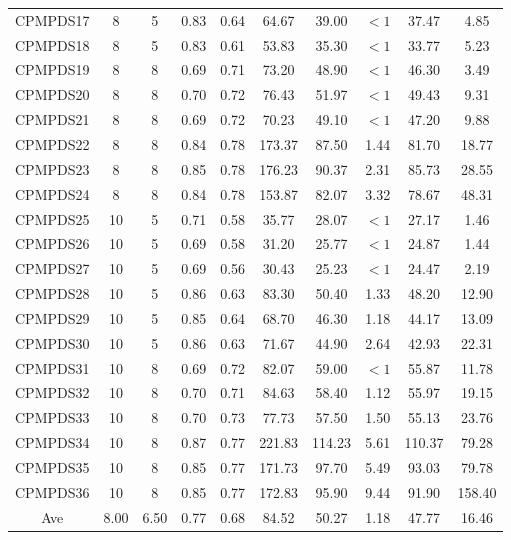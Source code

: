 \documentclass[review,3p,times,authoryear,12pt]{elsarticle}
\begin{document}
\begin{table}[htbp]
\begin{tabular}{c|c|c|c|c|c|c|c|c|c}
    CPMPDS17 & 8     & 5     & 0.83  & 0.64  & 64.67   & 39.00  & $<1$    & 37.47  & 4.85  \\
    CPMPDS18 & 8     & 5     & 0.83  & 0.61  & 53.83   & 35.30  & $<1$    & 33.77  & 5.23  \\
    CPMPDS19 & 8     & 8     & 0.69  & 0.71  & 73.20   & 48.90  & $<1$    & 46.30  & 3.49  \\
    CPMPDS20 & 8     & 8     & 0.70  & 0.72  & 76.43   & 51.97  & $<1$    & 49.43  & 9.31  \\
    CPMPDS21 & 8     & 8     & 0.69  & 0.72  & 70.23   & 49.10  & $<1$    & 47.20  & 9.88  \\
    CPMPDS22 & 8     & 8     & 0.84  & 0.78  & 173.37  & 87.50  & 1.44    & 81.70  & 18.77  \\
    CPMPDS23 & 8     & 8     & 0.85  & 0.78  & 176.23  & 90.37  & 2.31    & 85.73  & 28.55  \\
    CPMPDS24 & 8     & 8     & 0.84  & 0.78  & 153.87  & 82.07  & 3.32    & 78.67  & 48.31  \\
    CPMPDS25 & 10    & 5     & 0.71  & 0.58  & 35.77   & 28.07  & $<1$    & 27.17  & 1.46  \\
    CPMPDS26 & 10    & 5     & 0.69  & 0.58  & 31.20   & 25.77  & $<1$    & 24.87  & 1.44  \\
    CPMPDS27 & 10    & 5     & 0.69  & 0.56  & 30.43   & 25.23  & $<1$    & 24.47  & 2.19  \\
    CPMPDS28 & 10    & 5     & 0.86  & 0.63  & 83.30   & 50.40  & 1.33    & 48.20  & 12.90  \\
    CPMPDS29 & 10    & 5     & 0.85  & 0.64  & 68.70   & 46.30  & 1.18    & 44.17  & 13.09  \\
    CPMPDS30 & 10    & 5     & 0.86  & 0.63  & 71.67   & 44.90  & 2.64    & 42.93  & 22.31  \\
    CPMPDS31 & 10    & 8     & 0.69  & 0.72  & 82.07   & 59.00  & $<1$    & 55.87  & 11.78  \\
    CPMPDS32 & 10    & 8     & 0.70  & 0.71  & 84.63   & 58.40  & 1.12    & 55.97  & 19.15  \\
    CPMPDS33 & 10    & 8     & 0.70  & 0.73  & 77.73   & 57.50  & 1.50    & 55.13  & 23.76  \\
    CPMPDS34 & 10    & 8     & 0.87  & 0.77  & 221.83  & 114.23 & 5.61    & 110.37 & 79.28  \\
    CPMPDS35 & 10    & 8     & 0.85  & 0.77  & 171.73  & 97.70  & 5.49    & 93.03  & 79.78  \\
    CPMPDS36 & 10    & 8     & 0.85  & 0.77  & 172.83  & 95.90  & 9.44    & 91.90  & 158.40  \\
    \hline
    Ave      & 8.00  & 6.50  & 0.77  & 0.68  & 84.52   & 50.27  & 1.18    & 47.77  & 16.46  \\
    \hline
\end{tabular}
\end{table}%
\end{document}
